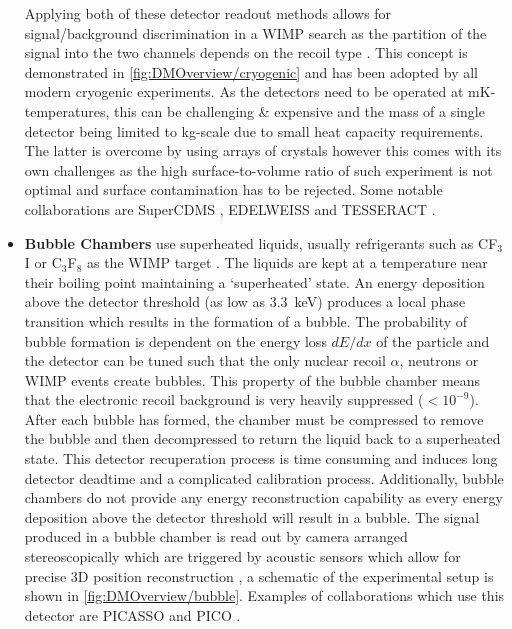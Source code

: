 \begin{itemize}
    Applying both of these detector readout methods allows for signal/background discrimination in a WIMP search as the partition of the signal into the two channels depends on the recoil type \cite{PhysRevLett.69.3425}. This concept is demonstrated in \autoref{fig:DMOverview/cryogenic} and has been adopted by all modern cryogenic experiments. As the detectors need to be operated at mK-temperatures, this can be challenging \& expensive and the mass of a single detector being limited to kg-scale due to small heat capacity requirements. The latter is overcome by using arrays of crystals however this comes with its own challenges as the high surface-to-volume ratio of such experiment is not optimal and surface contamination has to be rejected. Some notable collaborations are SuperCDMS \cite{SuperCDMS:2014cds}, EDELWEISS \cite{Benoit:2002hf} and TESSERACT \cite{TESSERACT:2025tfw}.
    
    \item \textbf{Bubble Chambers} use superheated liquids, usually refrigerants such as CF$_3$I or C$_3$F$_8$ as the WIMP target \cite{Schumann:2019eaa}. The liquids are kept at a temperature near their boiling point maintaining a `superheated' state. An energy deposition above the detector threshold (as low as 3.3~keV) produces a local phase transition which results in the formation of a bubble. The probability of bubble formation is dependent on the energy loss $dE/dx$ of the particle and the detector can be tuned such that the only nuclear recoil $\alpha$, neutrons or WIMP events create bubbles. This property of the bubble chamber means that the electronic recoil background is very heavily suppressed ($< 10^{-9}$). After each bubble has formed, the chamber must be compressed to remove the bubble and then decompressed to return the liquid back to a superheated state. This detector recuperation process is time consuming and induces long detector deadtime and a complicated calibration process. Additionally, bubble chambers do not provide any energy reconstruction capability as every energy deposition above the detector threshold will result in a bubble. The signal produced in a bubble chamber is read out by camera arranged stereoscopically which are triggered by acoustic sensors which allow for precise 3D position reconstruction \cite{edfraser:thesis}, a schematic of the experimental setup is shown in \autoref{fig:DMOverview/bubble}. Examples of collaborations which use this detector are PICASSO \cite{Behnke:2016lsk} and PICO \cite{PICO:2015pux}.
    

\end{itemize}
